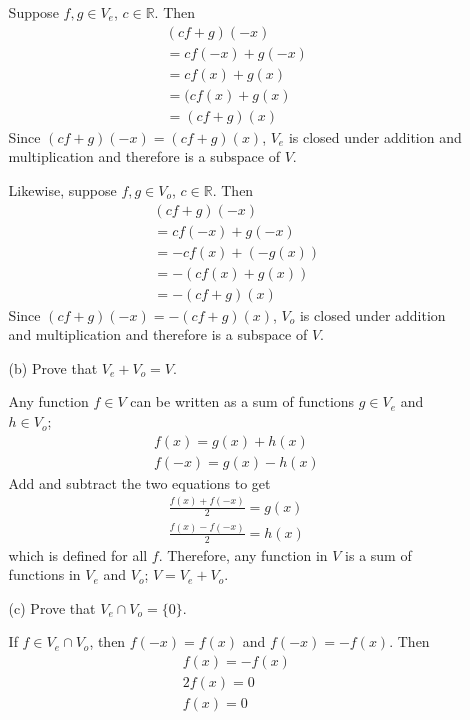 \documentclass{article}
\begin{document}
\begin{enumerate}[listparindent=\parindent]
\begin{enumerate}[listparindent=\parindent]
            Suppose \(f, g \in V_e\), \(c \in \mathbb{R}\). Then
            \begin{gather*}
                (cf + g)(-x) \\
                = cf(-x) + g(-x) \\
                = cf(x) + g(x) \\
                = (cf(x) + g(x) \\
                = (cf + g)(x)
            \end{gather*}
            Since \((cf + g)(-x) = (cf + g)(x)\), \(V_e\) is closed under addition and multiplication
            and therefore is a subspace of \(V\).

            Likewise, suppose \(f, g \in V_o\), \(c \in \mathbb{R}\). Then
            \begin{gather*}
                (cf + g)(-x) \\
                = cf(-x) + g(-x) \\
                = -cf(x) + (-g(x)) \\
                = -(cf(x) + g(x)) \\
                = -(cf + g)(x)
            \end{gather*}
            Since \((cf + g)(-x) = -(cf + g)(x)\), \(V_o\) is closed under addition and multiplication
            and therefore is a subspace of \(V\).

        \item[(b)] Prove that \(V_e + V_o = V\).

            Any function \(f \in V\) can be written as a sum of functions \(g \in V_e\) and \(h \in V_o\);
            \begin{gather*}
                f(x) = g(x) + h(x) \\
                f(-x) = g(x) - h(x)
            \end{gather*}
            Add and subtract the two equations to get
            \begin{gather*}
                \frac{f(x) + f(-x)}{2} = g(x) \\
                \frac{f(x) - f(-x)}{2} = h(x)
            \end{gather*}
            which is defined for all \(f\).
            Therefore, any function in \(V\) is a sum of functions in \(V_e\) and \(V_o\); \(V = V_e + V_o\).

        \item[(c)] Prove that \(V_e \cap V_o = \{0\}\).

            If \(f \in V_e \cap V_o\), then \(f(-x) = f(x)\) and \(f(-x) = -f(x)\). Then
            \begin{gather*}
                f(x) = -f(x) \\
                2f(x) = 0 \\
                f(x) = 0
            \end{gather*}
    \end{enumerate}


\end{enumerate}
\end{document}
